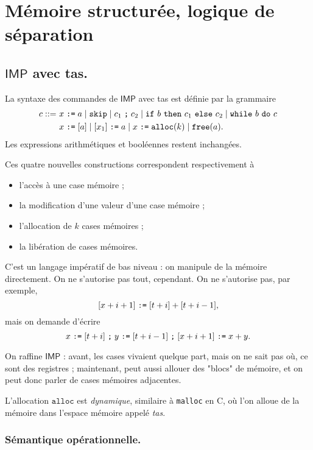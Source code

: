 \documentclass[../main]{subfiles}
\begin{document}
  \chapter{Mémoire structurée, logique de séparation}
  \minitoc

  \section{$\mathsf{IMP}$ avec tas.}

  La syntaxe des commandes de $\mathsf{IMP}$ avec tas est définie par la grammaire 
  \begin{align*}
    c ::= \ &x \mathrel{\texttt{:=}} a  \mid \texttt{skip}  \mid c_1 \mathrel{\texttt{;}} c_2  \mid \texttt{if}\ b\ \texttt{then}\ c_1\ \texttt{else}\ c_2  \mid \texttt{while}\ b\ \texttt{do}\ c\\
          &x \mathrel{\texttt{:=}} [a]  \mid [x_1] \mathrel{\texttt{:=}} a  \mid x \mathrel{\texttt{:=}} \texttt{alloc}(k)  \mid \texttt{free}(a).
  \end{align*}
  Les expressions arithmétiques et booléennes restent inchangées.

  Ces quatre nouvelles constructions correspondent respectivement à 
  \begin{itemize}
    \item l'accès à une case mémoire ;
    \item la modification d'une valeur d'une case mémoire ;
    \item l'allocation de $k$ cases mémoires ;
    \item la libération de cases mémoires.
  \end{itemize}

  \begin{rmk}
    C'est un langage impératif de bas niveau : on manipule de la mémoire directement.
    On ne s'autorise pas tout, cependant. On ne s'autorise pas, par exemple, \[
      [x + i + 1] \mathrel{\texttt{:=}} [t + i] + [t + i - 1]
    ,\] mais on demande d'écrire \[
      x \mathrel{\texttt{:=}} [t+i]\mathrel{\texttt{;}} y \mathrel{\texttt{:=}} [t + i - 1] \mathrel{\texttt{;}} [x + i + 1] \mathrel{\texttt{:=}} x + y
    .\]
  \end{rmk}

  On raffine $\mathsf{IMP}$ : avant, les cases vivaient quelque part, mais on ne sait pas où, ce sont des registres ; maintenant, peut aussi allouer des "blocs" de mémoire, et on peut donc parler de cases mémoires adjacentes.

  L'allocation $\mathtt{alloc}$ est \textit{dynamique}, similaire à \texttt{malloc} en C, où l'on alloue de la mémoire dans l'espace mémoire appelé \textit{tas}.

  \subsection{Sémantique opérationnelle.}
\end{document}
